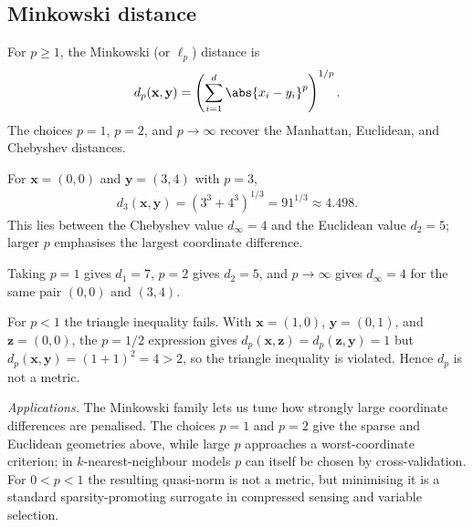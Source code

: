 \documentclass[a4paper, 12pt]{book}
\begin{document}
\subsection{Minkowski distance}
\begin{definition}
    For $p\geq1$, the Minkowski (or $\ell_p$) distance is
    \begin{align}
        d_p(\mathbf{x},\mathbf{y}) = \left(\sum_{i=1}^d \abs{x_i-y_i}^p\right)^{1/p}.
    \end{align}
    The choices $p=1$, $p=2$, and $p\to\infty$ recover the Manhattan, Euclidean, and Chebyshev distances.
\end{definition}

\begin{example}
    For $\mathbf{x}=(0,0)$ and $\mathbf{y}=(3,4)$ with $p=3$,
    \begin{align}
        d_3(\mathbf{x},\mathbf{y})=(3^3+4^3)^{1/3}=91^{1/3}\approx4.498.
    \end{align}
    This lies between the Chebyshev value $d_\infty=4$ and the Euclidean value $d_2=5$; larger $p$ emphasises the largest coordinate difference.
\end{example}

\begin{example}
    Taking $p=1$ gives $d_1=7$, $p=2$ gives $d_2=5$, and $p\to\infty$ gives $d_\infty=4$ for the same pair $(0,0)$ and $(3,4)$.
\end{example}

\begin{example}
    For $p<1$ the triangle inequality fails. With $\mathbf{x}=(1,0)$, $\mathbf{y}=(0,1)$, and $\mathbf{z}=(0,0)$, the $p=1/2$ expression gives $d_p(\mathbf{x},\mathbf{z})=d_p(\mathbf{z},\mathbf{y})=1$ but $d_p(\mathbf{x},\mathbf{y})=(1+1)^2=4>2$, so the triangle inequality is violated. Hence $d_p$ is not a metric.
\end{example}

\emph{Applications.} The Minkowski family lets us tune how strongly large coordinate differences are penalised. The choices $p=1$ and $p=2$ give the sparse and Euclidean geometries above, while large $p$ approaches a worst-coordinate criterion; in $k$-nearest-neighbour models $p$ can itself be chosen by cross-validation. For $0<p<1$ the resulting quasi-norm is not a metric, but minimising it is a standard sparsity-promoting surrogate in compressed sensing and variable selection.
\end{document}
